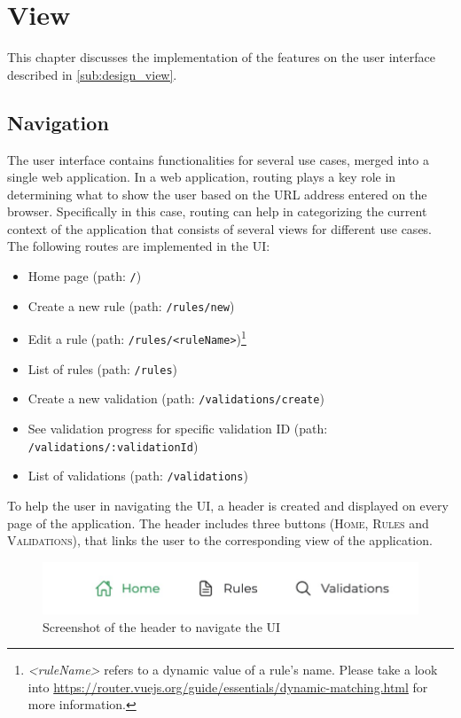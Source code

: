 \section{View}

  This chapter discusses the implementation of the features on the user interface described in \autoref{sub:design_view}.

  \subsection{Navigation}
  
    The user interface contains functionalities for several use cases, merged into a single web application. In a web application, routing plays a key role in determining what to show the user based on the URL address entered on the browser. Specifically in this case, routing can help in categorizing the current context of the application that consists of several views for different use cases. The following routes are implemented in the UI:

    \begin{itemize}
     \item Home page (path: \verb;/;)
     \item Create a new rule (path: \verb;/rules/new;)
     \item Edit a rule (path: \verb;/rules/<ruleName>;)\footnote{\emph{<ruleName>} refers to a dynamic value of a rule's name. Please take a look into \url{https://router.vuejs.org/guide/essentials/dynamic-matching.html} for more information.}
     \item List of rules (path: \verb;/rules;)
     \item Create a new validation (path: \verb;/validations/create;)
     \item See validation progress for specific validation ID (path: \verb;/validations/:validationId;)
     \item List of validations (path: \verb;/validations;)
    \end{itemize}
    
    To help the user in navigating the UI, a header is created and displayed on every page of the application. The header includes three buttons (\textsc{Home, Rules} and \textsc{Validations}), that links the user to the corresponding view of the application. 

    \begin{figure}[!ht]
     \includegraphics[width=\textwidth]{images/ss_navigation.jpeg}
     \caption{Screenshot of the header to navigate the UI}
    \end{figure}

